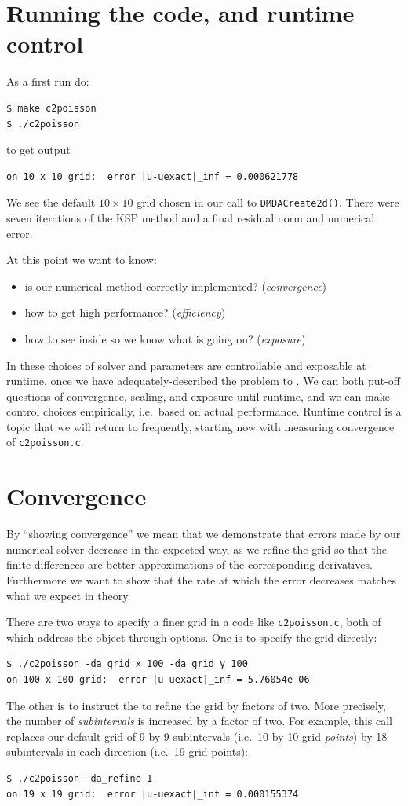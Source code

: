 \section{Running the code, and runtime control}

As a first run do:
\begin{Verbatim}[fontsize=\small]
$ make c2poisson
$ ./c2poisson
\end{Verbatim}
to get output
\begin{Verbatim}[fontsize=\small]
on 10 x 10 grid:  error |u-uexact|_inf = 0.000621778
\end{Verbatim}
We see the default $10\times 10$ grid chosen in our call to \texttt{DMDACreate2d()}. There were seven iterations of the KSP method and a final residual norm and numerical error.

At this point we want to know:\begin{itemize}
\item is our numerical method correctly implemented? (\emph{convergence})
\item how to get high performance? (\emph{efficiency})
\item how to see inside \PETSc so we know what is going on? (\emph{exposure})
\end{itemize}
In \PETSc these choices of solver and parameters are controllable and exposable at runtime, once we have adequately-described the problem to \PETSc.  We can both put-off questions of convergence, scaling, and exposure until runtime, and we can make control choices empirically, i.e.~based on actual performance.  Runtime control is a topic that we will return to frequently, starting now with measuring convergence of \texttt{c2poisson.c}.


\section{Convergence}

By ``showing convergence'' we mean that we demonstrate that errors made by our numerical solver decrease in the expected way, as we refine the grid so that the finite differences are better approximations of the corresponding derivatives.  Furthermore we want to show that the rate at which the error decreases matches what we expect in theory.

There are two ways to specify a finer grid in a code like \texttt{c2poisson.c}, both of which address the \pDM object through options.  One is to specify the grid directly:
\begin{Verbatim}[fontsize=\small]
$ ./c2poisson -da_grid_x 100 -da_grid_y 100
on 100 x 100 grid:  error |u-uexact|_inf = 5.76054e-06
\end{Verbatim}
The other is to instruct the \pDM to refine the grid by factors of two.  More precisely, the number of \emph{subintervals} is increased by a factor of two.  For example, this call replaces our default grid of 9 by 9 subintervals (i.e.~10 by 10 grid \emph{points}) by 18 subintervals in each direction (i.e.~19 grid points):
\begin{Verbatim}[fontsize=\small]
$ ./c2poisson -da_refine 1
on 19 x 19 grid:  error |u-uexact|_inf = 0.000155374
\end{Verbatim}

